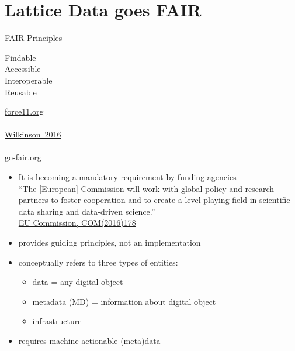 \documentclass[aspectratio=169,xcolor=dvipsnames]{beamer}
\begin{document}
\section{Lattice Data goes FAIR}
\begin{frame}{FAIR Principles} 

  \hspace*{7em}
  \parbox{40mm}{
  \alert{F}indable\\
  \hspace*{3em} \alert{A}ccessible \\
  \hspace*{6em} \alert{I}nteroperable \\
  \hspace*{9em} \alert{R}eusable
  }
  \hfill
  \parbox{26mm}{\footnotesize
    \href{https://www.force11.orf}{force11.org}\\[-1mm]
    \hspace*{8mm}{\footnotesize $\vdots$}\\[-1mm]
    \href{https://www.nature.com/articles/sdata201618}{Wilkinson~2016}\\[-1mm]
    \hspace*{8mm}{\footnotesize $\vdots$}\\[-1mm]
    \href{https://www.go-fair.org/fair-principles}{go-fair.org}
  }

  \vspace*{5mm}
  \begin{itemize}
    \item It is becoming a mandatory \alert{requirement} by funding agencies \\
      {\small ``The [European] Commission will work with global policy and research
        partners to foster cooperation and to create a level playing field in
        scientific data sharing and data-driven science.''\\
      \hfill\href{https://eur-lex.europa.eu/legal-content/en/TXT/?uri=CELEX:52016DC0178}{EU Commission, COM(2016)178}
      }
    \item provides \alert{guiding principles}, not an implementation
    \item conceptually refers to three types of entities: %
      \begin{itemize}
        \item data = any digital object
        \item metadata (MD) = information about digital object
        \item infrastructure
      \end{itemize}
    \item requires machine actionable (meta)data
  \end{itemize}
\end{frame}
\end{document}
